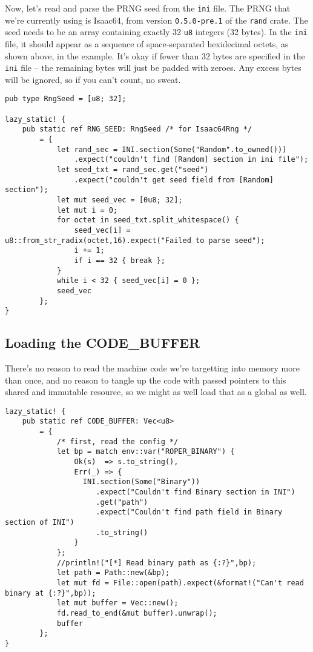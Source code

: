 \documentclass[11pt]{article}
\begin{document}
Now, let's read and parse the PRNG seed from the \texttt{ini} file. The PRNG
that we're currently using is Isaac64, from version \texttt{0.5.0-pre.1} of
the \texttt{rand} crate. The seed needs to be an array containing exactly 32 \texttt{u8}
integers (32 bytes). In the \texttt{ini} file, it should appear as a sequence of
space-separated hexidecimal octets, as shown above, in the example. It's
okay if fewer than 32 bytes are specified in the \texttt{ini} file -- the remaining
bytes will just be padded with zeroes. Any excess bytes will be ignored,
so if you can't count, no sweat.

\lstset{language=rust,label=org4618c6e,caption= ,captionpos=b,numbers=none}
\begin{lstlisting}
pub type RngSeed = [u8; 32];

lazy_static! {
    pub static ref RNG_SEED: RngSeed /* for Isaac64Rng */
        = {
            let rand_sec = INI.section(Some("Random".to_owned()))
                .expect("couldn't find [Random] section in ini file");
            let seed_txt = rand_sec.get("seed")
                .expect("couldn't get seed field from [Random] section");
            let mut seed_vec = [0u8; 32];
            let mut i = 0;
            for octet in seed_txt.split_whitespace() {
                seed_vec[i] = u8::from_str_radix(octet,16).expect("Failed to parse seed");
                i += 1;
                if i == 32 { break };
            }
            while i < 32 { seed_vec[i] = 0 };
            seed_vec
        };
}
\end{lstlisting}

\subsection{Loading the CODE\_BUFFER}
\label{sec:org92c46ae}

There's no reason to read the machine code we're targetting into memory
more than once, and no reason to tangle up the code with passed pointers
to this shared and immutable resource, so we might as well load that as
a global as well.
\lstset{language=rust,label=org9660514,caption= ,captionpos=b,numbers=none}
\begin{lstlisting}
lazy_static! {
    pub static ref CODE_BUFFER: Vec<u8>
        = {
            /* first, read the config */
            let bp = match env::var("ROPER_BINARY") {
                Ok(s)  => s.to_string(),
                Err(_) => {
                  INI.section(Some("Binary"))
                     .expect("Couldn't find Binary section in INI")
                     .get("path")
                     .expect("Couldn't find path field in Binary section of INI")
                     .to_string()
                }
            };
            //println!("[*] Read binary path as {:?}",bp);
            let path = Path::new(&bp);
            let mut fd = File::open(path).expect(&format!("Can't read binary at {:?}",bp));
            let mut buffer = Vec::new();
            fd.read_to_end(&mut buffer).unwrap();
            buffer
        };
}
\end{lstlisting}
\end{document}
